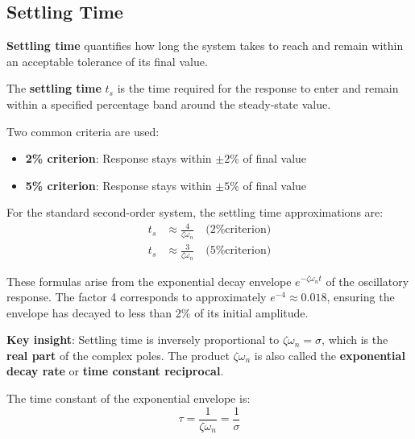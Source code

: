 
\subsection{Settling Time}
\label{subsec:settling_time}

\textbf{Settling time} quantifies how long the system takes to reach and remain within an acceptable tolerance of its final value.

\begin{definition}
The \textbf{settling time} $t_s$ is the time required for the response to enter and remain within a specified percentage band around the steady-state value.
\end{definition}

Two common criteria are used:
\begin{itemize}
    \item \textbf{2\% criterion}: Response stays within $\pm 2\%$ of final value
    \item \textbf{5\% criterion}: Response stays within $\pm 5\%$ of final value
\end{itemize}

For the standard second-order system, the settling time approximations are:
\begin{align}
    t_s &\approx \frac{4}{\zeta\omega_n} \quad \text{(2\% criterion)} \label{eq:settling_2pct} \\
    t_s &\approx \frac{3}{\zeta\omega_n} \quad \text{(5\% criterion)} \label{eq:settling_5pct}
\end{align}

These formulas arise from the exponential decay envelope $e^{-\zeta\omega_n t}$ of the oscillatory response. The factor 4 corresponds to approximately $e^{-4} \approx 0.018$, ensuring the envelope has decayed to less than 2\% of its initial amplitude.

\textbf{Key insight}: Settling time is inversely proportional to $\zeta\omega_n = \sigma$, which is the \textbf{real part} of the complex poles. The product $\zeta\omega_n$ is also called the \textbf{exponential decay rate} or \textbf{time constant reciprocal}.

The time constant of the exponential envelope is:
\begin{equation}
    \tau = \frac{1}{\zeta\omega_n} = \frac{1}{\sigma}
\end{equation}

